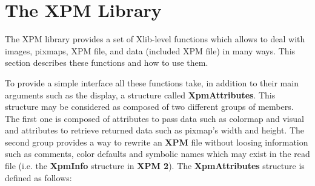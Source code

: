 \newpage
\section{The {\bf XPM} Library}

The XPM library provides a set of Xlib-level functions which allows to deal
with images, pixmaps, XPM file, and data (included XPM file) in many ways.
This section describes these functions and how to use them.

\vspace{.5cm}
To provide a simple interface all these functions take, in addition to their
main arguments such as the display, a structure called {\bf XpmAttributes}.
This structure may be considered as composed of two different groups of
members. The first one is composed of attributes to pass data such as colormap
and visual and attributes to retrieve returned data such as pixmap's width and
height. The second group provides a way to rewrite an {\bf XPM} file without
loosing information such as comments, color defaults and symbolic names which
may exist in the read file (i.e. the {\bf XpmInfo} structure in {\bf XPM 2}).
The {\bf XpmAttributes} structure is defined as follows:

